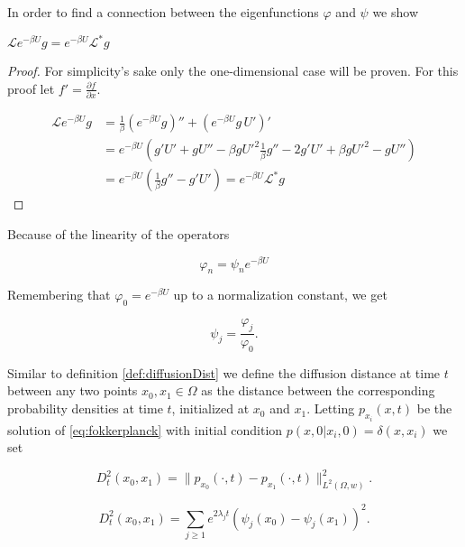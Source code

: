 In order to find a connection between the eigenfunctions $\varphi$ and $\psi$ we show
\begin{lemma}
$\mathcal{L}e^{-\beta U}g = e^{-\beta U}\mathcal{L}^*g$
\end{lemma}

\begin{proof}
For simplicity's sake only the one-dimensional case will be proven. For this proof let $f' = \frac{\partial f}{\partial x}$.

\begin{equation*}\begin{aligned}
\mathcal{L}e^{-\beta U}g &= \frac{1}{\beta}(e^{-\beta U}g)'' + \left(e^{-\beta U}g\,U' \right)'\\
&= e^{-\beta U}\left(g'U'+gU''-\beta gU'^2\frac{1}{\beta}g''-2g'U'+\beta gU'^2-gU'' \right)\\
&= e^{-\beta U}\left(\frac{1}{\beta}g'' - g'U'\right) = e^{-\beta U}\mathcal{L}^*g
\end{aligned}\end{equation*}
\end{proof}

Because of the linearity of the operators

\begin{equation*}
\varphi_n = \psi_n e^{-\beta U}
\end{equation*}

Remembering that $\varphi_0 = e^{-\beta U}$ up to a normalization constant, we get

\begin{equation}\label{eq:connectionBetweenEigenfunctions}
\psi_j = \frac{\varphi_j}{\varphi_0}.
\end{equation}

Similar to definition \ref{def:diffusionDist} we define the diffusion distance at time $t$ between any two points $x_0, x_1 \in \Omega$ as the distance between the corresponding probability densities at time $t$, initialized at $x_0$ and $x_1$. Letting $p_{x_i}(x,t)$ be the solution of \eqref{eq:fokkerplanck} with initial condition $p(x,0 | x_i, 0) = \delta(x,x_i)$ we set

\begin{definition}\label{def:diffDistance2}
\begin{equation*}
D_t^2(x_0,x_1) = \|p_{x_0}(\cdot, t) - p_{x_1}(\cdot, t) \|_{L^2(\Omega, w)}^2.
\end{equation*}
\end{definition}

\begin{lemma}\begin{equation*}
D_t^2(x_0,x_1) = \sum_{j\geq 1} e^{2\lambda_j t} (\psi_j(x_0)-\psi_j(x_1))^2.
\end{equation*}\end{lemma}

